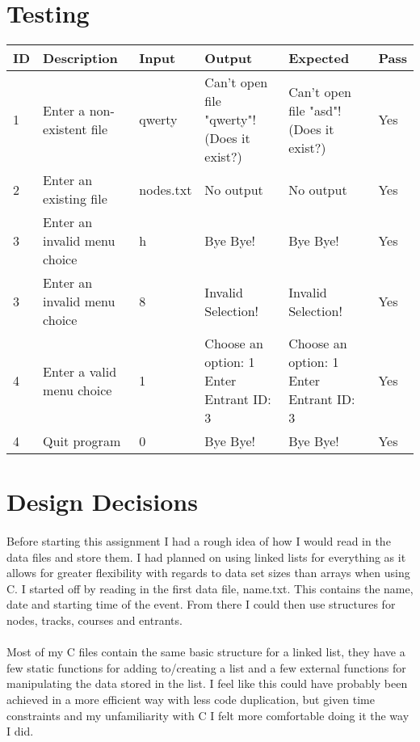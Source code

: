\documentclass[pdftex,12pt,a4paper]{article}
\begin{document}
\section{Testing}
\begin{tabular*}{16cm}{| p{.5cm} | p{2cm} | p{2cm} | p{4cm} | p{4cm} | p{1cm} |}
\hline
ID & Description & Input & Output & Expected & Pass \\
\hline
1 & Enter a non-existent file & qwerty & Can't open file "qwerty"! (Does it exist?) & Can't open file "asd"! (Does it exist?) & Yes \\
\hline
2 & Enter an existing file & nodes.txt & No output & No output & Yes \\
\hline
3 & Enter an invalid menu choice & h & Bye Bye! & Bye Bye! & Yes \\
\hline
3 & Enter an invalid menu choice & 8 & Invalid Selection! & Invalid Selection! & Yes \\
\hline
4 & Enter a valid menu choice & 1 & Choose an option: 1 Enter Entrant ID: 3 & Choose an option: 1 Enter Entrant ID: 3 & Yes \\
\hline
4 & Quit program & 0 & Bye Bye! & Bye Bye! & Yes \\
\hline
\end{tabular*}

\newpage

\section{Design Decisions}
\paragraph{}Before starting this assignment I had a rough idea of how I would read in the data files and store them. I had planned on using linked lists for everything as it allows for greater flexibility with regards to data set sizes than arrays when using C. I started off by reading in the first data file, name.txt. This contains the name, date and starting time of the event. From there I could then use structures for nodes, tracks, courses and entrants.
\paragraph{}Most of my C files contain the same basic structure for a linked list, they have a few static functions for adding to/creating a list and a few external functions for manipulating the data stored in the list. I feel like this could have probably been achieved in a more efficient way with less code duplication, but given time constraints and my unfamiliarity with C I felt more comfortable doing it the way I did.
\end{document}
